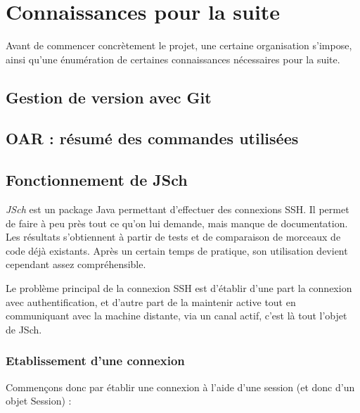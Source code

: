 
\section{Connaissances pour la suite}
\label{sec:preliminaires}

\par Avant de commencer concrètement le projet, une certaine organisation s'impose, ainsi qu'une énumération de certaines connaissances nécessaires pour la suite. 

\subsection{Gestion de version avec Git}
\label{sec:gestion-de-version}



\subsection{OAR : résumé des commandes utilisées}
\label{sec:oar-:-resume}




\subsection{Fonctionnement de JSch}

\par \emph{JSch} est un package Java permettant d'effectuer des connexions SSH. Il permet de faire à peu près tout ce qu'on lui demande, mais manque de documentation. Les résultats s'obtiennent à partir de tests et de comparaison de morceaux de code déjà existants. Après un certain temps de pratique, son utilisation devient cependant assez compréhensible.

\par Le problème principal de la connexion SSH est d'établir d'une part la connexion avec authentification, et d'autre part de la maintenir active tout en communiquant avec la machine distante, via un canal actif, c'est là tout l'objet de JSch.

\subsubsection{Etablissement d'une connexion}
\label{sec:etabl-dune-conn}

\par Commençons donc par établir une connexion à l'aide d'une session (et donc d'un objet Session) :

